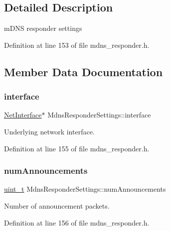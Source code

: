 \subsection{Detailed Description}
m\+D\+NS responder settings 

Definition at line 153 of file mdns\+\_\+responder.\+h.



\subsection{Member Data Documentation}
\mbox{\label{structMdnsResponderSettings_a41dce50accdf1d8b755c283ac0e643d4}} 
\subsubsection{\texorpdfstring{interface}{interface}}
{\footnotesize\ttfamily \hyperlink{net_8h_a2234db8911a1148c9159979d8f5e0d6b}{Net\+Interface}$\ast$ Mdns\+Responder\+Settings\+::interface}



Underlying network interface. 



Definition at line 155 of file mdns\+\_\+responder.\+h.

\mbox{\label{structMdnsResponderSettings_a282b3d4be3aed23875ffe59061294fc3}} 
\subsubsection{\texorpdfstring{num\+Announcements}{numAnnouncements}}
{\footnotesize\ttfamily \hyperlink{compiler__port_8h_a12a1e9b3ce141648783a82445d02b58d}{uint\+\_\+t} Mdns\+Responder\+Settings\+::num\+Announcements}



Number of announcement packets. 



Definition at line 156 of file mdns\+\_\+responder.\+h.

